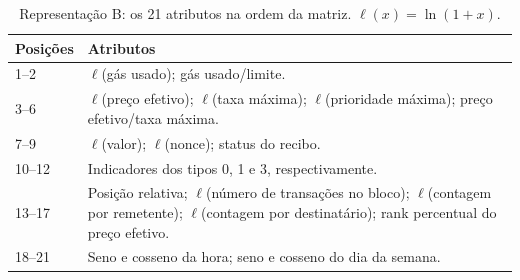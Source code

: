 \begin{table}[htbp]
\centering\small
\caption{Representação B: os 21 atributos na ordem da matriz. $\ell(x)=\ln(1+x)$.}
\label{tab:atributos}
\begin{tabularx}{\linewidth}{@{}l>{\raggedright\arraybackslash}X@{}}
\toprule
Posições & Atributos \\
\midrule
1--2 & $\ell$(gás usado); gás usado/limite. \\
3--6 & $\ell$(preço efetivo); $\ell$(taxa máxima); $\ell$(prioridade máxima); preço efetivo/taxa máxima. \\
7--9 & $\ell$(valor); $\ell$(nonce); status do recibo. \\
10--12 & Indicadores dos tipos 0, 1 e 3, respectivamente. \\
13--17 & Posição relativa; $\ell$(número de transações no bloco); $\ell$(contagem por remetente); $\ell$(contagem por destinatário); rank percentual do preço efetivo. \\
18--21 & Seno e cosseno da hora; seno e cosseno do dia da semana. \\
\bottomrule
\end{tabularx}
\end{table}
